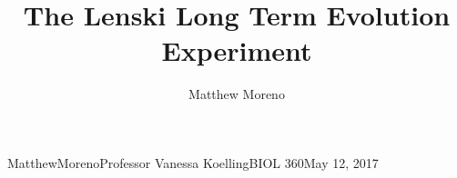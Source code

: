 \documentclass[12pt]{article}
\title{The Lenski Long Term Evolution Experiment}\let\Title\@title
\author{Matthew Moreno}
\begin{document}
\begin{mla}{Matthew}{Moreno}{Professor Vanessa Koelling}{BIOL 360}{May 12, 2017}{{\large \Title}\vspace{-1ex}}









\newpage




\end{mla}
\end{document}
